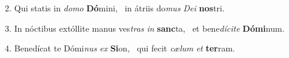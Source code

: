 2. Qui statis in \textit{do}\textit{mo} \textbf{Dó}mini, \ast\  in átriis do\textit{mus} \textit{De}\textit{i} \textbf{nos}tri.\

3. In nóctibus extóllite manus ves\textit{tras} \textit{in} \textbf{sanc}ta, \ast\  et bene\textit{dí}\textit{ci}\textit{te} \textbf{Dó}\textbf{mi}num.\

4. Benedícat te Dómi\textit{nus} \textit{ex} \textbf{Si}on, \ast\  qui fecit \textit{cæ}\textit{lum} \textit{et} \textbf{ter}ram.\

